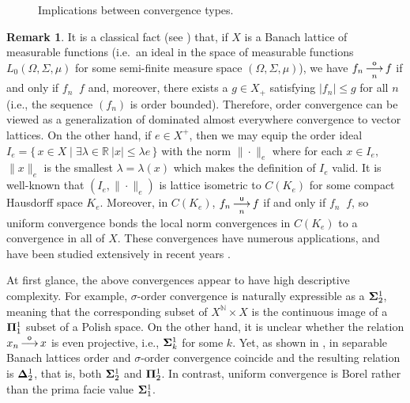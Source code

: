 \documentclass[10pt]{amsart}
\newcommand{\Mgd}[2]{\big\{\,  {#1}\;\big|\; {#2} \,\big\} }
\newcommand{\conv}[2]{\mathop{\underset{#2}{\overset{#1}\longrightarrow}}}
\newcommand{\maps}[1]{\mathop{\overset{#1}\longrightarrow}}
\newcommand {\1}{\mathbb 1}
\newcommand {\N}{\mathbb N}
\theoremstyle{plain}
\theoremstyle{definition}
\newtheorem{rem}[thm]{Remark}
\begin{document}
\begin{figure}[!htb]\label{diagram1}
\caption{Implications between convergence types.}
\end{figure}
\begin{rem}
    It is a classical fact (see \cite[Remark 1.3]{Tay}) that, if $X$ is a Banach lattice of measurable functions (i.e.~an ideal in the space of measurable functions $L_0(\Omega,\Sigma,\mu)$ for some semi-finite measure space $(\Omega,\Sigma,\mu)$), we have $f_n\conv{\sf o}{n}f$ if and only if $f_n\conv{a.e.}{n}f$ and, moreover,  there exists a $g\in X_+$ satisfying  $|f_n|\leqslant g$ for all $n$ (i.e., the sequence $(f_n)$ is order bounded). Therefore, order convergence can be viewed as a generalization of dominated almost everywhere convergence to vector lattices. On the other hand, if $e\in X^+$, then we may equip the order ideal $I_e=\Mgd{x\in X }{ \exists \lambda\in \mathbb{R}\  |x|\leq \lambda e}$ with the norm $\|\cdot\|_e$ where for each $x\in I_e,$ $\|x\|_e$ is the smallest $\lambda=\lambda(x)$ which makes the definition of $I_e$ valid. It is well-known that $(I_e,\|\cdot\|_e)$ is lattice isometric to $C(K_e)$ for some compact Hausdorff space $K_e$. Moreover, in $C(K_e)$, $f_n\conv{\sf u}{n}f$ if and only if $f_n\conv{\|\cdot\|_\infty}{n}f$, so uniform convergence bonds the local norm convergences in $C(K_e)$ to a convergence in all of $X$. These convergences have numerous applications, and have been studied extensively in recent years \cite{MR4366912,MR3731703,MR3818109}.
\end{rem}
At first glance, the above convergences appear to have high descriptive complexity. For example, $\sigma$-order convergence is naturally expressible as a ${\bf \Sigma}^1_2$, meaning that the corresponding subset of $X^\N\times X$ is the continuous image of a ${\bf \Pi}^1_1$ subset of a Polish space. On the other hand, it is unclear whether the relation $x_n\maps{\sf o}x$ is even projective, i.e., ${\bf \Sigma}^1_k$ for some $k$. Yet, as shown in \cite{ARTT}, in separable Banach lattices order and $\sigma$-order convergence coincide and the resulting relation is ${\bf \Delta}^1_2$, that is, both ${\bf \Sigma}^1_2$ and ${\bf \Pi}^1_2$. In contrast, uniform convergence is  Borel rather than the prima facie value ${\bf \Sigma}^1_1$.
\end{document}

